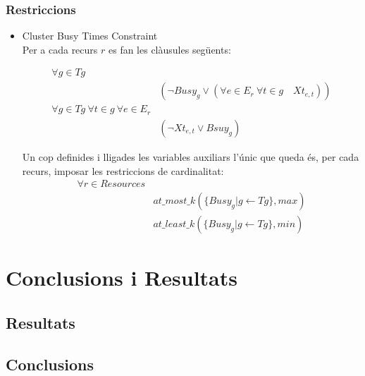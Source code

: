 \documentclass[11pt]{beamer}
\begin{document}
  \begin{frame}
    \frametitle{Restriccions}

    \begin{itemize}
    
      \item Cluster Busy Times Constraint \\
      Per a cada recurs $r$ es fan les clàusules següents:
      
      \begin{align*}
        \forall g \in Tg & \\
        &(\neg Busy_g \lor (\forall e \in E_r \ \forall t \in g \quad Xt_{e,t}))\\
        \forall g \in Tg \ \forall t \in g \ \forall e \in E_r &\\
        & (\neg Xt_{e,t} \lor Bsuy_g)
      \end{align*}
    
      Un cop definides i lligades les variables auxiliars l'únic que queda és, per cada recurs, imposar les restriccions de cardinalitat:
      \begin{align*}
        \forall r \in Resources &\\
        & at\_most\_k(\{ Busy_g | g \leftarrow Tg\}, max) \\
        & at\_least\_k(\{ Busy_g | g \leftarrow Tg\}, min)
       \end{align*}
          
    \end{itemize}
  
  \end{frame}


  \section{Conclusions i Resultats}
  \subsection{Resultats}
  
  \begin{frame}
  \end{frame}

  \subsection{Conclusions}





  
\end{document}
